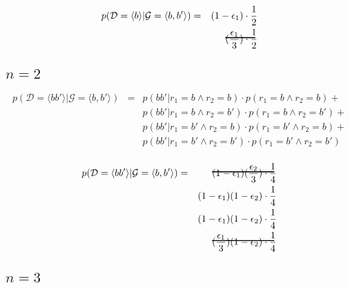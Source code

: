 \documentclass[a4paper,12pt]{article}
\newcommand\hcancel[2][black]{\setbox0=\hbox{$#2$}%
\rlap{\raisebox{.45\ht0}{\textcolor{#1}{\rule{\wd0}{1pt}}}}#2}
\begin{document}
\begin{eqnarray*}
p(\mathcal{D} = \langle b \rangle | \mathcal{G} = \langle b,b' \rangle) &  = & ( 1-\epsilon_1)   \cdot \frac {1} {2} \\
                                                                        &    & \hcancel{  (\frac{ \epsilon_1} {3} ) \cdot \frac {1} {2}} \\
\end{eqnarray*}

\subsection{$n=2$}
\begin{eqnarray*}
p(\mathcal{D} = \langle bb' \rangle| \mathcal{G} = \langle b,b' \rangle) & = &  p( bb' | r_1 = b  \land r_2 = b  )   \cdot p( r_1 =  b \land r_2 =  b)  + \\
                             &   &  p( bb' | r_1 = b  \land r_2 = b' )   \cdot p( r_1 =  b \land r_2 =  b')  +     \\
                             &   &  p( bb' | r_1 = b' \land r_2 = b  )   \cdot p( r_1 =  b' \land r_2 =  b)  +     \\
                             &   &  p( bb' | r_1 = b' \land r_2 = b' )   \cdot p( r_1 =  b' \land r_2 =  b')       \\                             
\end{eqnarray*}


\begin{eqnarray*}
p(\mathcal{D} = \langle bb' \rangle| \mathcal{G} = \langle b,b' \rangle) & = & \hcancel{ ( 1-\epsilon_1) (\frac{ \epsilon_2} {3})     \cdot \frac {1} {4} }\\            
                                                                         &   &  ( 1-\epsilon_1)( 1-\epsilon_2)    \cdot  \frac {1} {4} \\            
                                                                         &   &  ( 1-\epsilon_1)( 1-\epsilon_2)   \cdot  \frac {1} {4} \\            
                                                                         &   & \hcancel{ (\frac{ \epsilon_1} {3}) ( 1-\epsilon_2)       \cdot  \frac {1} {4}} \\            
\end{eqnarray*}

\subsection{$n=3$}
\end{document}
